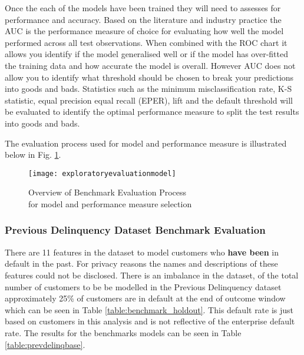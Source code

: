 Once the each of the models have been trained they will need to assesses for performance and accuracy. Based on the literature and industry practice the AUC is the performance measure of choice for evaluating how well the model performed across all test observations. When combined with the ROC chart it allows you identify if the model generalised well or if the model has over-fitted the training data and how accurate the model is overall. However AUC does not allow you to identify what threshold should be chosen to break your predictions into goods and bads. Statistics such as the minimum misclassification rate, K-S statistic, equal precision equal recall (EPER), lift and the default threshold will be evaluated to identify the optimal performance measure to split the test results into goods and bads. 

The evaluation process used for model and performance measure is illustrated below in Fig. \ref{fig:exploratoryevaluationmodel}. 

\begin{figure}[H]
	\texttt{[image: exploratoryevaluationmodel]}
	\caption{Overview of Benchmark Evaluation Process\\for model and performance measure selection}
	\label{fig:exploratoryevaluationmodel}
\end{figure}

\subsubsection{Previous Delinquency Dataset Benchmark Evaluation}

There are 11 features in the dataset to model customers who \textbf{have been} in default in the past. For privacy reasons the names and descriptions of these features could not be disclosed. There is an imbalance in the dataset, of the total number of customers to be be modelled in the Previous Delinquency dataset approximately 25\% of customers are in default at the end of outcome window which can be seen in Table \ref{table:benchmark_holdout}. This default rate is just based on customers in this analysis and is not reflective of the enterprise default rate. The results for the benchmarks models can be seen in Table \ref{table:prevdelinqbase}.

